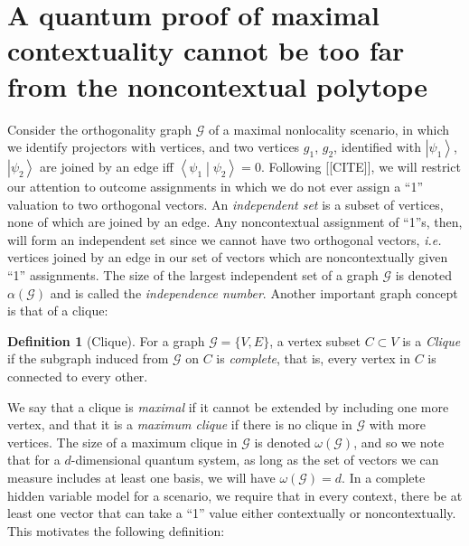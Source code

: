 \documentclass{amsart}
\theoremstyle{definition}
\newtheorem{defn}{Definition}
\newcommand{\ket}[1]{{\left\vert{#1}\right\rangle}}
\newcommand{\braket}[2]{{\left< {#1} \middle\vert {#2}\right>}}
\begin{document}
\section{A quantum proof of maximal contextuality cannot be too far from the noncontextual polytope}

Consider the orthogonality graph $\mathcal{G}$ of a maximal nonlocality scenario, in which we identify projectors with vertices, and two vertices $g_1$, $g_2$, identified with $\ket{\psi_1}$, $\ket{\psi_2}$ are joined by an edge iff $\braket{\psi_1}{\psi_2}=0$. Following [[CITE]], we will restrict our attention to outcome assignments in which we do not ever assign a ``1'' valuation to two orthogonal vectors. An \emph{independent set} is a subset of vertices, none of which are joined by an edge. Any noncontextual assignment of ``1''s, then, will form an independent set since we cannot have two orthogonal vectors, \emph{i.e.} vertices joined by an edge in our set of vectors which are noncontextually given ``1'' assignments. The size of the largest independent set of a graph $\mathcal{G}$ is denoted $\alpha(\mathcal{G})$ and is called the \emph{independence number}. Another important graph concept is that of a clique:%

\begin{defn}[Clique]
For a graph $\mathcal{G}=\{V,E\}$, a vertex subset $C\subset V$ is a \emph{Clique} if the subgraph induced from $\mathcal{G}$ on $C$ is \emph{complete}, that is,  every vertex in $C$ is connected to every other.
\end{defn}

We say that a clique is \emph{maximal} if it cannot be extended by including one more vertex, and that it is a \emph{maximum clique} if there is no clique in $\mathcal{G}$ with more vertices. The size of a maximum clique in $\mathcal{G}$ is denoted $\omega(\mathcal{G})$, and so we note that for a $d$-dimensional quantum system, as long as the set of vectors we can measure includes at least one basis, we will have $\omega(\mathcal{G})=d$. In a complete hidden variable model for a scenario, we require that in every context, there be at least one vector that can take a ``1'' value either contextually or noncontextually. This motivates the following definition:
\end{document}
